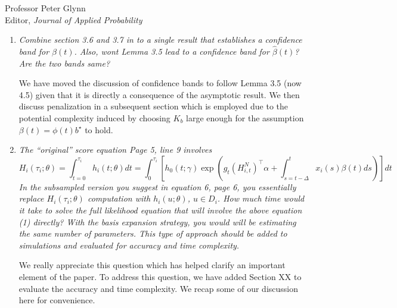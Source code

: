 \documentclass[11pt]{letter} %
\begin{document}
\begin{letter}{Professor
	Peter Glynn\\
	Editor, {\em Journal of Applied Probability}}
\begin{enumerate}
\vspace{5mm}
We have now included the statement of how we define optimality in the main paper to make the theorem statement clear.  Specifically, we view weights $w^\star$ as optimal if the difference between the asympotic variance~$V (\theta_0; w^\star)$ and the asymptotic variance under any other choice of weights~$w$, $V(\theta_0; w)$ is postivie semi-definite. The proof is kept in the supplementary materials for conciseness.
\vspace{5mm}

\item {\it Combine section 3.6 and 3.7 in to a single result that establishes a confidence band for $\beta (t)$. Also, wont Lemma 3.5 lead to a confidence band for $\hat \beta (t)$? Are the two bands same?}

\vspace{5mm}
We have moved the discussion of confidence bands to follow Lemma 3.5 (now 4.5) given that it is directly a consequence of the asymptotic result.  We then  discuss penalization in a subsequent section which is employed due to the potential complexity induced by choosing $K_b$ large enough for the assumption $\beta (t) =\phi (t) b^\star$ to hold.
\vspace{5mm}

\item {\it The ``original'' score equation Page 5, line 9 involves
$$
H_i (\tau_i ;\theta) = \int_{t=0}^{\tau_i} h_i (t; \theta)dt = \int_0^{\tau_i} \left[ h_0 (t;\gamma) \exp \left( g_t (H_{i,t}^N)^\top \alpha + \int_{s=t-\Delta}^t x_i (s) \beta(t) ds \right) \right] dt
$$
In the subsampled version you suggest in equation 6, page 6, you essentially replace $H_i (\tau_i; \theta)$ computation with $h_i (u; \theta)$, $u \in D_i$. How much time would it take to solve the full likelihood equation that will involve the above equation (1) directly? With the basis expansion strategy, you
would will be estimating the same number of parameters. This type of approach should be added to simulations and evaluated for accuracy and time complexity.}

\vspace{5mm}
We really appreciate this question which has helped clarify an important element of the paper.  To address this question, we have added Section XX to evaluate the accuracy and time complexity.  We recap some of our discussion here for convenience.
\vspace{5mm}


\end{enumerate}
\end{letter}
\end{document}
